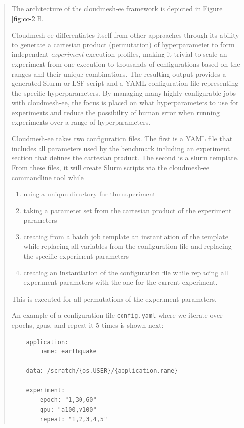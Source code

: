 \documentclass[utf8]{FrontiersinVancouver} %
\begin{document}
\begin{quote}
The architecture of the cloudmesh-ee framework is depicted in Figure \ref{fig:cc-2}B.

Cloudmesh-ee differentiates itself from other approaches through its ability to generate a cartesian product (permutation) of hyperparameter to form independent {\it experiment} execution profiles, making it trivial to scale an experiment from one execution to thousands of configurations based on the ranges and their unique combinations.  The resulting output provides a generated Slurm or LSF script and a YAML configuration file representing the specific hyperparameters.  By managing many highly configurable jobs with cloudmesh-ee, the focus is placed on what hyperparameters to use for experiments and reduce the possibility of human error when running experiments over a range of hyperparameters.

Cloudmesh-ee takes two configuration files. The first is a YAML file that includes all parameters used by the benchmark including an experiment section that defines the cartesian product. The second is a slurm template. From these files, it will create Slurm scripts via the cloudmesh-ee commandline tool while

\begin{enumerate}
  \item using a unique directory for the experiment
  \item taking a parameter set from the cartesian product of the experiment parameters
  \item creating from a batch job template an instantiation of the template while replacing all variables from the configuration file    and replacing the specific experiment parameters
  \item creating an instantiation of the configuration file while replacing all experiment parameters with the one for the current experiment.
\end{enumerate}

This is executed for all permutations of the experiment parameters.

An example of a configuration file \verb|config.yaml| where we iterate over epochs, gpus, and repeat it 5 times is shown next:

\begin{lstlisting}
    application:
        name: earthquake

    data: /scratch/{os.USER}/{application.name}
       
    experiment:
        epoch: "1,30,60"
        gpu: "a100,v100"
        repeat: "1,2,3,4,5"
\end{lstlisting}


\end{quote}
\end{document}

